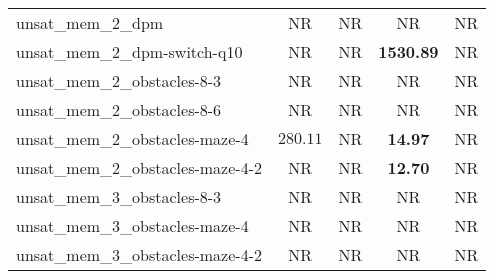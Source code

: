 \begin{tabular}{lcccc}
unsat\_mem\_2\_dpm & NR & NR & NR & NR \\
unsat\_mem\_2\_dpm-switch-q10 & NR & NR & \textbf{1530.89} & NR \\
unsat\_mem\_2\_obstacles-8-3 & NR & NR & NR & NR \\
unsat\_mem\_2\_obstacles-8-6 & NR & NR & NR & NR \\
unsat\_mem\_2\_obstacles-maze-4 & $280.11$ & NR & \textbf{14.97} & NR \\
unsat\_mem\_2\_obstacles-maze-4-2 & NR & NR & \textbf{12.70} & NR \\
unsat\_mem\_3\_obstacles-8-3 & NR & NR & NR & NR \\
unsat\_mem\_3\_obstacles-maze-4 & NR & NR & NR & NR \\
unsat\_mem\_3\_obstacles-maze-4-2 & NR & NR & NR & NR \\
\bottomrule
\end{tabular}
